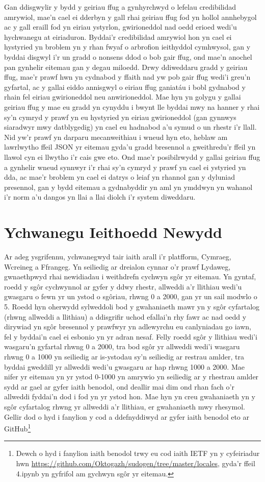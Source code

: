 Gan ddisgwylir y bydd y geiriau ffug a gynhyrchwyd o lefelau credibilidad amrywiol, mae'n cael ei dderbyn y gall rhai geiriau ffug fod yn hollol annhebygol ac y gall eraill fod yn eiriau ystyrlon, gwirioneddol nad oedd erioed wedi'u hychwanegu at eiriaduron. Byddai'r credibilidad amrywiol hon yn cael ei hystyried yn broblem yn y rhan fwyaf o arbrofion ieithyddol cymhwysol, gan y byddai disgwyl i'r un gradd o nonsens ddod o bob gair ffug, ond mae'n anochel pan gynhelir eitemau gan y degau miloedd. Drwy ddiweddaru gradd y geiriau ffug, mae'r prawf hwn yn cydnabod y ffaith nad yw pob gair ffug wedi'i greu'n gyfartal, ac y gallai eiddo annisgwyl o eiriau ffug ganiatáu i bobl gydnabod y rhain fel eiriau gwirioneddol neu anwirioneddol. Mae hyn yn golygu y gallai geiriau ffug y mae eu gradd yn cynyddu i bwynt lle byddai mwy na hanner y rhai sy'n cymryd y prawf yn eu hystyried yn eiriau gwirioneddol (gan gynnwys siaradwyr mwy datblygedig) yn cael eu hadnabod a'u symud o un rhestr i'r llall. Nid yw'r prawf yn darparu mecanweithiau i wneud hyn eto, heblaw am lawrlwytho ffeil JSON yr eitemau gyda'u gradd bresennol a gweithredu'r ffeil yn llawol cyn ei llwytho i'r cais gwe eto. Ond mae'r posibilrwydd y gallai geiriau ffug a gynhelir wneud synnwyr i'r rhai sy'n cymryd y prawf yn cael ei ystyried yn dda, ac mae'r broblem yn cael ei datrys o leiaf yn rhannol gan y dyluniad presennol, gan y bydd eitemau a gydnabyddir yn aml yn ymddwyn yn wahanol i'r norm a'u dangos yn llai a llai diolch i'r system diweddaru.

\section{Ychwanegu Ieithoedd Newydd}
Ar adeg ysgrifennu, ychwanegwyd tair iaith arall i'r platfform, Cymraeg, Wcreineg a Ffrangeg. Yn seiliedig ar dreialon cynnar o'r prawf Lydaweg, gwnaethpwyd rhai newidiadau i weithdrefn cychwyn sgôr yr eitemau. Yn gyntaf, roedd y sgôr cychwynnol ar gyfer y ddwy rhestr, allweddi a'r llithiau wedi'u gwasgaru o fewn yr un ystod o sgôriau, rhwng 0 a 2000, gan yr un sail modwlo o 5. Roedd hyn oherwydd sylweddoli bod y gwahaniaeth mawr yn y sgôr cyfartalog (rhwng allweddi a llithiau) a ddisgrifir uchod efallai'n rhy fawr ac nad oedd y dirywiad yn sgôr bresennol y prawfwyr yn adlewyrchu eu canlyniadau go iawn, fel y byddai'n cael ei esbonio yn yr adran nesaf. Felly roedd sgôr y llithiau wedi'i wasgaru'n gyfartal rhwng 0 a 2000, tra bod sgôr yr allweddi wedi'i wasgaru rhwng 0 a 1000 yn seiliedig ar is-ystodau sy'n seiliedig ar restrau amlder, tra byddai gweddill yr allweddi wedi'u gwasgaru ar hap rhwng 1000 a 2000. Mae nifer yr eitemau yn yr ystod 0-1000 yn amrywio yn seiliedig ar y rhestrau amlder sydd ar gael ar gyfer iaith benodol, ond deallir mai dim ond rhan fach o'r allweddi fyddai'n dod i fod yn yr ystod hon. Mae hyn yn creu gwahaniaeth yn y sgôr cyfartalog rhwng yr allweddi a'r llithiau, er gwahaniaeth mwy rhesymol. Gellir dod o hyd i fanylion y cod a ddefnyddiwyd ar gyfer iaith benodol eto ar GitHub\footnote{Dewch o hyd i fanylion iaith benodol trwy eu cod iaith IETF yn y cyfeiriadur hwn \url{https://github.com/Oktogazh/sudogen/tree/master/locales}, gyda'r ffeil 4.ipynb yn gyfrifol am gychwyn sgôr yr eitemau.}

